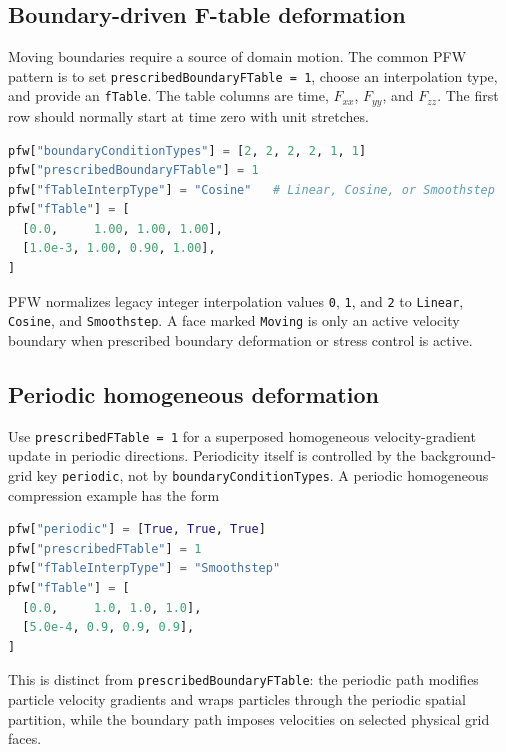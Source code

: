 \subsection{Boundary-driven F-table deformation}

Moving boundaries require a source of domain motion.  The common PFW pattern is to set \texttt{prescribedBoundaryFTable = 1}, choose an interpolation type, and provide an \texttt{fTable}.  The table columns are time, $F_{xx}$, $F_{yy}$, and $F_{zz}$.  The first row should normally start at time zero with unit stretches.
\begin{lstlisting}[language=Python,caption={Boundary-driven diagonal deformation history.}]
pfw["boundaryConditionTypes"] = [2, 2, 2, 2, 1, 1]
pfw["prescribedBoundaryFTable"] = 1
pfw["fTableInterpType"] = "Cosine"   # Linear, Cosine, or Smoothstep
pfw["fTable"] = [
  [0.0,     1.00, 1.00, 1.00],
  [1.0e-3, 1.00, 0.90, 1.00],
]
\end{lstlisting}
PFW normalizes legacy integer interpolation values \texttt{0}, \texttt{1}, and \texttt{2} to \texttt{Linear}, \texttt{Cosine}, and \texttt{Smoothstep}.  A face marked \texttt{Moving} is only an active velocity boundary when prescribed boundary deformation or stress control is active.

\subsection{Periodic homogeneous deformation}

Use \texttt{prescribedFTable = 1} for a superposed homogeneous velocity-gradient update in periodic directions.  Periodicity itself is controlled by the background-grid key \texttt{periodic}, not by \texttt{boundaryConditionTypes}.  A periodic homogeneous compression example has the form
\begin{lstlisting}[language=Python,caption={Periodic F-table control.}]
pfw["periodic"] = [True, True, True]
pfw["prescribedFTable"] = 1
pfw["fTableInterpType"] = "Smoothstep"
pfw["fTable"] = [
  [0.0,     1.0, 1.0, 1.0],
  [5.0e-4, 0.9, 0.9, 0.9],
]
\end{lstlisting}
This is distinct from \texttt{prescribedBoundaryFTable}: the periodic path modifies particle velocity gradients and wraps particles through the periodic spatial partition, while the boundary path imposes velocities on selected physical grid faces.

